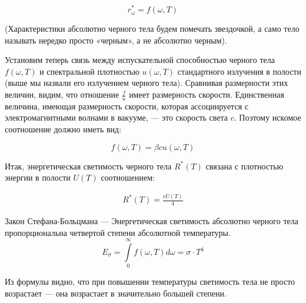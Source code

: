 	$$r_ω^{*} = f(ω,T)$$

	(Характеристики абсолютно черного тела будем помечать звездочкой, а само тело называть нередко просто «черным», а не абсолютно черным).

	Установим теперь связь между испускательной способностью черного тела $f(ω,T)$ и спектральной плотностью  $u(ω,T)$ стандартного излучения в полости (выше мы назвали его излучением черного тела). Сравнивая размерности этих величин, видим, что отношение $\frac{f}{u}$ имеет размерность скорости. Единственная величина, имеющая размерность скорости, которая ассоциируется с электромагнитными волнами в вакууме, — это скорость света $c$. Поэтому искомое соотношение должно иметь вид:
	
	$$f(ω,T)=βcu(ω,T)$$
	
	Итак, энергетическая светимость черного тела  $R^{*}(T)$  связана с плотностью энергии в полости $U(T)$ соотношением:
	
	\begin{gather}
		R^{*} (T)=\frac{cU(T)}{4}  
	\end{gather}
	
	
	Закон Стефана-Больцмана — Энергетическая светимость абсолютно черного тела пропорциональна четвертой степени абсолютной температуры.\\
	
	$$E_σ = \int\limits_{0}^{\infty} f(ω,T)dω = σ\cdot T^4$$

	Из формулы видно, что при повышении температуры светимость тела не просто возрастает — она возрастает в значительно большей степени.




	
